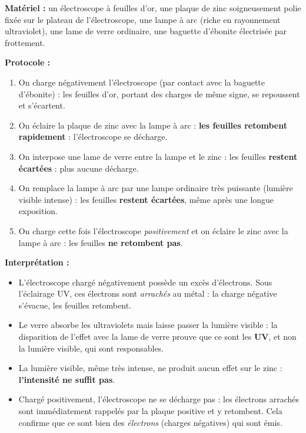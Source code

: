 \documentclass[11pt]{article}
\begin{document}
\begin{experience}
\textbf{Matériel :} un électroscope à feuilles d'or, une plaque de zinc soigneusement polie fixée sur le plateau de l'électroscope, une lampe à arc (riche en rayonnement ultraviolet), une lame de verre ordinaire, une baguette d'ébonite électrisée par frottement.

\textbf{Protocole :}
\begin{enumerate}
\item On charge négativement l'électroscope (par contact avec la baguette d'ébonite) : les feuilles d'or, portant des charges de même signe, se repoussent et s'écartent.
\item On éclaire la plaque de zinc avec la lampe à arc : \textbf{les feuilles retombent rapidement} : l'électroscope se décharge.
\item On interpose une lame de verre entre la lampe et le zinc : les feuilles \textbf{restent écartées} : plus aucune décharge.
\item On remplace la lampe à arc par une lampe ordinaire très puissante (lumière visible intense) : les feuilles \textbf{restent écartées}, même après une longue exposition.
\item On charge cette fois l'électroscope \emph{positivement} et on éclaire le zinc avec la lampe à arc : les feuilles \textbf{ne retombent pas}.
\end{enumerate}

\textbf{Interprétation :}
\begin{itemize}
\item L'électroscope chargé négativement possède un excès d'électrons. Sous l'éclairage UV, ces électrons sont \emph{arrachés} au métal : la charge négative s'évacue, les feuilles retombent.
\item Le verre absorbe les ultraviolets mais laisse passer la lumière visible : la disparition de l'effet avec la lame de verre prouve que ce sont les \textbf{UV}, et non la lumière visible, qui sont responsables.
\item La lumière visible, même très intense, ne produit aucun effet sur le zinc : \textbf{l'intensité ne suffit pas}.
\item Chargé positivement, l'électroscope ne se décharge pas : les électrons arrachés sont immédiatement rappelés par la plaque positive et y retombent. Cela confirme que ce sont bien des \emph{électrons} (charges négatives) qui sont émis.
\end{itemize}
\end{experience}
\end{document}
